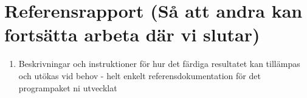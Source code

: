 


\section{Referensrapport (Så att andra kan fortsätta arbeta där vi slutar)}
\begin{enumerate}
\item Beskrivningar och instruktioner för hur det färdiga resultatet kan tillämpas och utökas vid behov - helt enkelt referensdokumentation för det programpaket ni utvecklat
\end{enumerate}
